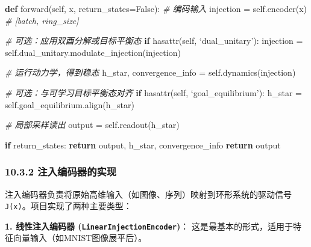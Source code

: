 \documentclass[
  12pt,
]{article}
\newenvironment{Shaded}{}{}
\newcommand{\BuiltInTok}[1]{#1}
\newcommand{\CommentTok}[1]{\textcolor[rgb]{0.38,0.63,0.69}{\textit{#1}}}
\newcommand{\ControlFlowTok}[1]{\textcolor[rgb]{0.00,0.44,0.13}{\textbf{#1}}}
\newcommand{\KeywordTok}[1]{\textcolor[rgb]{0.00,0.44,0.13}{\textbf{#1}}}
\newcommand{\NormalTok}[1]{#1}
\newcommand{\OperatorTok}[1]{\textcolor[rgb]{0.40,0.40,0.40}{#1}}
\newcommand{\VariableTok}[1]{\textcolor[rgb]{0.10,0.09,0.49}{#1}}
\begin{document}
\begin{Shaded}
\begin{Highlighting}[]
\KeywordTok{def}\NormalTok{ forward(}\VariableTok{self}\NormalTok{, x, return\_states}\OperatorTok{=}\VariableTok{False}\NormalTok{):}
    \CommentTok{\# 编码输入}
\NormalTok{    injection }\OperatorTok{=} \VariableTok{self}\NormalTok{.encoder(x)  }\CommentTok{\# [batch, ring\_size]}
    
    \CommentTok{\# 可选：应用双酉分解或目标平衡态}
    \ControlFlowTok{if} \BuiltInTok{hasattr}\NormalTok{(}\VariableTok{self}\NormalTok{, ‘dual\_unitary’):}
\NormalTok{        injection }\OperatorTok{=} \VariableTok{self}\NormalTok{.dual\_unitary.modulate\_injection(injection)}
    
    \CommentTok{\# 运行动力学，得到稳态}
\NormalTok{    h\_star, convergence\_info }\OperatorTok{=} \VariableTok{self}\NormalTok{.dynamics(injection)}
    
    \CommentTok{\# 可选：与可学习目标平衡态对齐}
    \ControlFlowTok{if} \BuiltInTok{hasattr}\NormalTok{(}\VariableTok{self}\NormalTok{, ‘goal\_equilibrium’):}
\NormalTok{        h\_star }\OperatorTok{=} \VariableTok{self}\NormalTok{.goal\_equilibrium.align(h\_star)}
    
    \CommentTok{\# 局部采样读出}
\NormalTok{    output }\OperatorTok{=} \VariableTok{self}\NormalTok{.readout(h\_star)}
    
    \ControlFlowTok{if}\NormalTok{ return\_states:}
        \ControlFlowTok{return}\NormalTok{ output, h\_star, convergence\_info}
    \ControlFlowTok{return}\NormalTok{ output}
\end{Highlighting}
\end{Shaded}

\hypertarget{ux6ce8ux5165ux7f16ux7801ux5668ux7684ux5b9eux73b0}{%
\subsubsection{10.3.2
注入编码器的实现}\label{ux6ce8ux5165ux7f16ux7801ux5668ux7684ux5b9eux73b0}}

注入编码器负责将原始高维输入（如图像、序列）映射到环形系统的驱动信号\texttt{J(x)}。项目实现了两种主要类型：

\textbf{1. 线性注入编码器 (\texttt{LinearInjectionEncoder})}：
这是最基本的形式，适用于特征向量输入（如MNIST图像展平后）。
\end{document}
